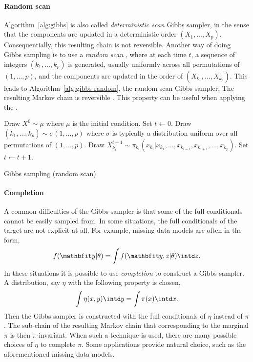\paragraph{Random scan}

Algorithm~\ref{alg:gibbs} is also called \emph{deterministic scan} Gibbs
sampler, in the sense that the components are updated in a deterministic order
$(X_1,\dots,X_p)$. Consequentially, this resulting chain is not reversible.
Another way of doing Gibbs sampling is to use a \emph{random scan}
\cite{Liu1995Gibbs}, where at each time $t$, a sequence of integers
$(k_1,\dots,k_p)$ is generated, usually uniformly across all permutations of
$(1,\dots,p)$, and the components are updated in the order of
$(X_{k_1},\dots,X_{k_p})$. This leads to Algorithm~\ref{alg:gibbs random}, the
random scan Gibbs sampler. The resulting Markov chain is reversible
\cite{Liu1995Gibbs}. This property can be useful when applying the \clt
\cite[][sec.~10.1.2]{Robert:2004tn}.

\begin{algorithm}
\begin{algorithmic}
  \tophrule
  \STATE Draw $X^0\sim\mu$ where $\mu$ is the initial condition.
  \STATE Set $t\leftarrow0$.
  \REPEAT
    \STATE Draw $(k_1,\dots,k_p)\sim\sigma(1,\dots,p)$ where $\sigma$ is
    typically a distribution uniform over all permutations of $(1,\dots,p)$.
      \STATE Draw
      $X_{k_i}^{t+1}\sim
      \pi_{k_i}(x_{k_i}|x_{k_1},\dots,x_{k_{i-1}},x_{k_{i+1}},\dots,x_{k_p})$.
    \ENDFOR
    \STATE Set $t\leftarrow t+1$.
  \bottomhrule
\end{algorithmic}
\caption{Gibbs sampling (random scan)}
\label{alg:gibbs random}
\end{algorithm}

\paragraph{Completion}

A common difficulties of the Gibbs sampler is that some of the full
conditionals cannot be easily sampled from. In some situations, the full
conditionals of the target are not explicit at all. For example, missing data
models are often in the form,
\begin{equation*}
  f(\data|\theta) = \int f(\data, z|\theta)\intd z.
\end{equation*}
In these situations it is possible to use \emph{completion} to construct a
Gibbs sampler. A distribution, say $\eta$ with the following property is
chosen,
\begin{equation}
  \int\eta(x,y)\intd y = \int\pi(x)\intd x.
\end{equation}
Then the Gibbs sampler is constructed with the full conditionals of $\eta$
instead of $\pi$. The sub-chain of the resulting Markov chain that
corresponding to the marginal $\pi$ is then $\pi$-invariant. When such a
technique is used, there are many possible choices of $\eta$ to complete
$\pi$. Some applications provide natural choice, such as the aforementioned
missing data models.

